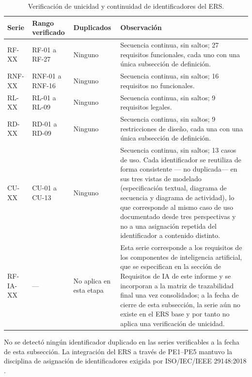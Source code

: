 \documentclass[journal,onecolumn]{IEEEtran}
\begin{document}
\begin{table}[H]
	\centering
	\caption{Verificación de unicidad y continuidad de identificadores del ERS.}
	\label{tab:unicidad-ids}
	\renewcommand{\arraystretch}{1.3}
	\begin{tabularx}{\textwidth}{
		|>{\raggedright\arraybackslash}p{2.2cm}
		|>{\raggedright\arraybackslash}p{2.6cm}
		|>{\raggedright\arraybackslash}p{2.2cm}
		|>{\raggedright\arraybackslash}X|}
		\hline
		\textbf{Serie} & \textbf{Rango verificado} & \textbf{Duplicados} & \textbf{Observación} \\
		\hline
		RF-XX & RF-01 a RF-27 & Ninguno & Secuencia continua, sin saltos; 27 requisitos funcionales, cada uno con una única subsección de definición. \\
		\hline
		RNF-XX & RNF-01 a RNF-16 & Ninguno & Secuencia continua, sin saltos; 16 requisitos no funcionales. \\
		\hline
		RL-XX & RL-01 a RL-09 & Ninguno & Secuencia continua, sin saltos; 9 requisitos legales. \\
		\hline
		RD-XX & RD-01 a RD-09 & Ninguno & Secuencia continua, sin saltos; 9 restricciones de diseño, cada una con una única subsección de definición. \\
		\hline
		CU-XX & CU-01 a CU-13 & Ninguno & Secuencia continua, sin saltos; 13 casos de uso. Cada identificador se reutiliza de forma consistente --- no duplicada--- en sus tres vistas de modelado (especificación textual, diagrama de secuencia y diagrama de actividad), lo que corresponde al mismo caso de uso documentado desde tres perspectivas y no a una asignación repetida del identificador a contenido distinto. \\
		\hline
		RF-IA-XX & --- & No aplica en esta etapa & Esta serie corresponde a los requisitos de los componentes de inteligencia artificial, que se especifican en la sección de Requisitos de IA de este informe y se incorporan a la matriz de trazabilidad final una vez consolidados; a la fecha de cierre de esta subsección, la serie aún no existe en el ERS base y por tanto no aplica una verificación de unicidad. \\
		\hline
	\end{tabularx}
\end{table}

No se detectó ningún identificador duplicado en las series verificables a la
fecha de esta subsección. La integración del ERS a través de PE1--PE5
mantuvo la disciplina de asignación de identificadores exigida por
ISO/IEC/IEEE 29148:2018 \cite{ieee29148}.

\newpage

\printbibliography[heading=none]
\end{document}
